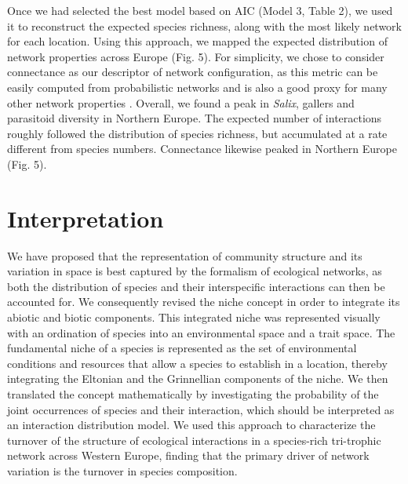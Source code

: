 \documentclass[12pt]{article}
\begin{document}
Once we had selected the best model based on AIC (Model 3, Table 2), we used
it to reconstruct the expected species richness, along with the most likely
network for each location. Using this approach, we mapped the expected
distribution of network properties across Europe (Fig. 5). For simplicity, we
chose to consider connectance as our descriptor of network configuration, as
this metric can be easily computed from probabilistic networks
\citep{Poisot2015c} and is also a good proxy for many other network properties
\citep{Poisot2014}. Overall, we found a peak in \textit{Salix}, gallers and
parasitoid diversity in Northern Europe. The expected number of interactions
roughly followed the distribution of species richness, but accumulated at a
rate different from species numbers. Connectance likewise peaked in Northern
Europe (Fig. 5).

\section*{Interpretation}

We have proposed that the representation of community structure and its
variation in space is best captured by the formalism of ecological networks,
as both the distribution of species and their interspecific interactions can
then be accounted for. We consequently revised the niche concept in order to
integrate its abiotic and biotic components. This integrated niche was
represented visually with an ordination of species into an environmental space
and a trait space. The fundamental niche of a species is represented as the
set of environmental conditions and resources that allow a species to
establish in a location, thereby integrating the Eltonian and the Grinnellian
components of the niche. We then translated the concept mathematically by
investigating the probability of the joint occurrences of species and their
interaction, which should be interpreted as an interaction distribution model.
We used this approach to characterize the turnover of the structure of
ecological interactions in a species-rich tri-trophic network across Western
Europe, finding that the primary driver of network variation is the turnover
in species composition.

\end{document}
